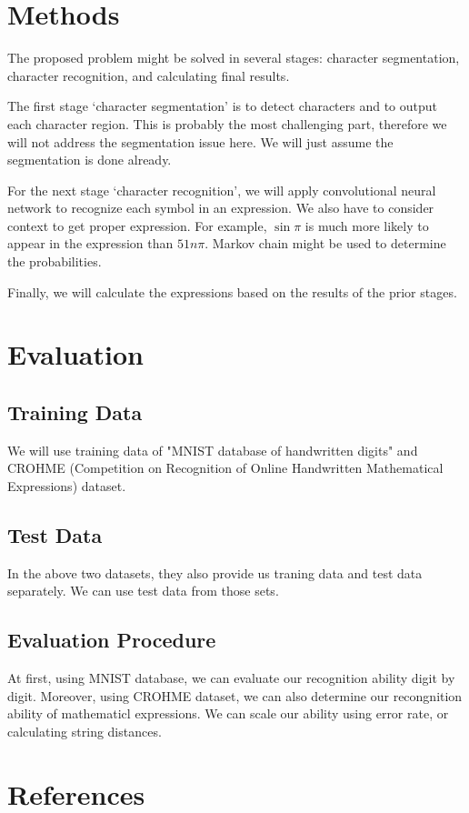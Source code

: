 \documentclass[10pt,twocolumn,letterpaper]{article}
\begin{document}
\section{Methods}

The proposed problem might be solved in several stages:
character segmentation, character recognition, and calculating final results.

The first stage `character segmentation' is to detect characters and to output each character region.
This is probably the most challenging part, therefore we will not address the segmentation issue here.
We will just assume the segmentation is done already. 

For the next stage `character recognition',
we will apply convolutional neural network to recognize each symbol in an expression.
We also have to consider context to get proper expression. For example, $\sin \pi$ is much more likely to appear in the expression than $51n \pi$. Markov chain might be used to determine the probabilities.

Finally, we will calculate the expressions based on the results of the prior stages.

\section{Evaluation}


\subsection{Training Data}

We will use training data of "MNIST database of handwritten digits"
and CROHME (Competition on Recognition of Online Handwritten Mathematical Expressions) dataset. 

\subsection{Test Data}

In the above two datasets, they also provide us traning data and test data separately.
We can use test data from those sets.

\subsection{Evaluation Procedure}

At first, using MNIST database, we can evaluate our recognition ability digit by digit.
Moreover, using CROHME dataset, we can also determine our recongnition ability of mathematicl expressions.
We can scale our ability using error rate, or calculating string distances.

\section{References}

{\small


}
\end{document}
